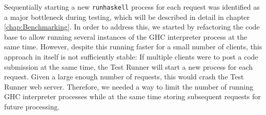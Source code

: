 Sequentially starting a new \texttt{runhaskell} process for each request was identified as a major bottleneck during testing, which will be described in detail in chapter \ref{chap:Benchmarking}.
In order to address this, we started by refactoring the code base to allow running several instances of the GHC interpreter process at the same time.
However, despite this running faster for a small number of clients, this approach in itself is not sufficiently stable:
If multiple clients were to post a code submission at the same time, the Test Runner will start a new process for each request.
Given a large enough number of requests, this would crash the Test Runner web server.
Therefore, we needed a way to limit the number of running GHC interpreter processes while at the same time storing subsequent requests for future processing.



